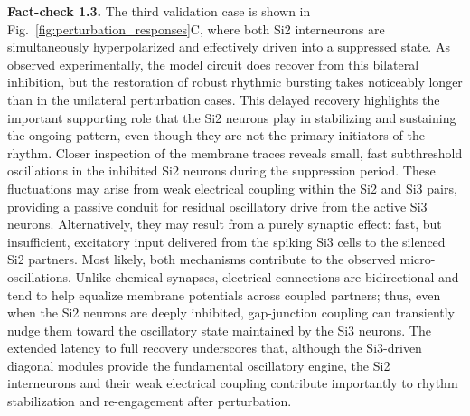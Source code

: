 \documentclass[nofootinbib,aip,amsmath,amssymb,preprint,twocolumn,floatfix,10pt]{revtex4-2}
\begin{document}
{\bf Fact-check 1.3.} The third validation case is shown in Fig.~\ref{fig:perturbation_responses}C, where both Si2 interneurons are simultaneously hyperpolarized and effectively driven into a suppressed state. As observed experimentally, the model circuit does recover from this bilateral inhibition, but the restoration of robust rhythmic bursting takes noticeably longer than in the unilateral perturbation cases. This delayed recovery highlights the important supporting role that the Si2 neurons play in stabilizing and sustaining the ongoing pattern, even though they are not the primary initiators of the rhythm.
Closer inspection of the membrane traces reveals small, fast subthreshold oscillations in the inhibited Si2 neurons during the suppression period. These fluctuations may arise from weak electrical coupling within the Si2 and Si3 pairs, providing a passive conduit for residual oscillatory drive from the active Si3 neurons. Alternatively, they may result from a purely synaptic effect: fast, but insufficient, excitatory input delivered from the spiking Si3 cells to the silenced Si2 partners. Most likely, both mechanisms contribute to the observed micro-oscillations. Unlike chemical synapses, electrical connections are bidirectional and tend to help equalize membrane potentials across coupled partners; thus, even when the Si2 neurons are deeply inhibited, gap-junction coupling can transiently nudge them toward the oscillatory state maintained by the Si3 neurons. The extended latency to full recovery underscores that, although the Si3-driven diagonal modules provide the fundamental oscillatory engine, the Si2 interneurons and their weak electrical coupling contribute importantly to rhythm stabilization and re-engagement after perturbation.
\end{document}
